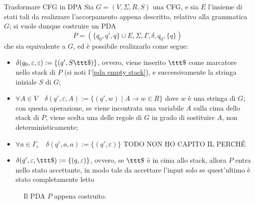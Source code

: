 \documentclass[a4paper, 12pt]{report}
\begin{document}
\begin{framedmeth}[breakable]{Trasformare CFG in DPA}
        Sia $G = (V, \Sigma, R, S)$ una CFG, e sia $E$ l'insieme di stati tali da realizzare l'accorpamento appena descritto, relativo alla grammatica $G$; si vuole dunque costruire un PDA $$P = (\{q_0, q', q\} \cup E, \Sigma, \Gamma, \delta, q_0, \{q\})$$ che sia equivalente a $G$, ed è possibile realizzarlo come segue:

        \begin{itemize}
            \item $\delta(q_0, \varepsilon, \varepsilon) := \{(q', S \ttt \$) \}$, ovvero, viene inserito $\ttt \$$ come marcatore nello stack di $P$ (si noti l'\cref{pda empty stack}), e successivamente la stringa iniziale $S$ di $G$;
            \item $\forall A \in V \quad \delta(q', \varepsilon, A) := \{ (q', w) \mid A \to w \in R\}$ dove $w$ è una stringa di $G$; con questa operazione, se viene incontrata una variabile $A$ sulla cima dello stack di $P$, viene scelta una delle regole di $G$ in grado di sostituire $A$, non deterministicamente;
            \item $\forall a \in \Gamma_\varepsilon \quad \delta(q', a, a) := \{ (q', \varepsilon) \}$ TODO NON HO CAPITO IL PERCHÉ
            \item $\delta(q', \varepsilon, \ttt \$) := \{(q, \varepsilon) \}$, ovvero, se $\ttt \$$ è in cima allo stack, allora $P$ entra nello stato accettante, in modo tale da accettare l'input solo se quest'ultimo è stato completamente letto
        \end{itemize}

        \begin{figure}[H]
            \centering
             \caption{Il PDA $P$ appena costruito.}
        \end{figure}

    \end{framedmeth}
\end{document}
